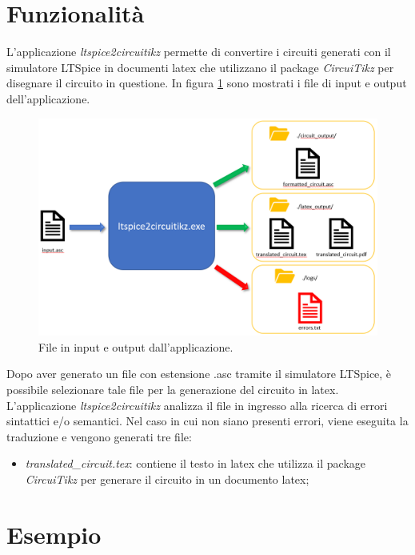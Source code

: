 \section{Funzionalità}
L'applicazione \textit{ltspice2circuitikz} permette di convertire i circuiti generati con il simulatore LTSpice in documenti latex che utilizzano il package \textit{CircuiTikz} per disegnare il circuito in questione. In figura \ref{fig:schema} sono mostrati i file di input e output dell'applicazione. 
\begin{figure}[h!]
	\centering
	\includegraphics[width=1\textwidth]{./ImageFiles/schema funzionamento.png}
	\caption{File in input e output dall'applicazione.}
	\label{fig:schema}
\end{figure}
Dopo aver generato un file con estensione .asc tramite il simulatore LTSpice, è possibile selezionare tale file per la generazione del circuito in latex. L'applicazione \textit{ltspice2circuitikz} analizza il file in ingresso alla ricerca di errori sintattici e/o semantici. Nel caso in cui non siano presenti errori, viene eseguita la traduzione e vengono generati tre file:
\begin{itemize}
	\item \textit{translated\_circuit.tex}: contiene il testo in latex che utilizza il package \textit{CircuiTikz} per generare il circuito in un documento latex;
\end{itemize}



\section{Esempio}





